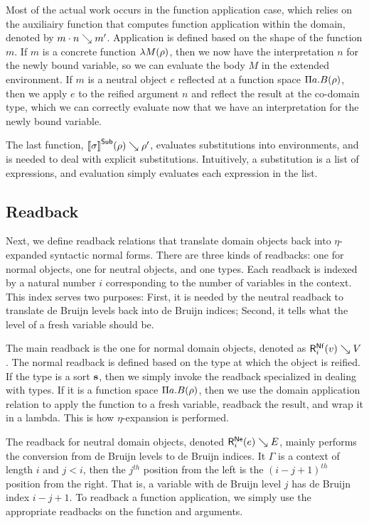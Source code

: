 Most of the actual work occurs in the function application case,
  which relies on the auxiliairy function that computes function application within the domain, denoted by $m \cdot n \searrow m'$.
Application is defined based on the shape of the function $m$.
If $m$ is a concrete function $\lambda M(\rho)$, then we now have the interpretation $n$ for the newly bound variable, so we can evaluate the body $M$ in the extended environment.
If $m$ is a neutral object $e$ reflected at a function space $\Pi a.B(\rho)$, then we apply $e$ to the reified argument $n$ and reflect the result at the co-domain type,
  which we can correctly evaluate now that we have an interpretation for the newly bound variable.
  
The last function, ${[\![\sigma]\!]}^{\mathsf{Sub}}(\rho) \searrow \rho'$, evaluates substitutions into environments, and is needed to deal with explicit substitutions.
Intuitively, a substitution is a list of expressions, and evaluation simply evaluates each expression in the list.



\subsection{Readback}



Next, we define readback relations that translate domain objects back into $\eta$-expanded syntactic normal forms.
There are three kinds of readbacks: one for normal objects, one for neutral objects, and one types.
Each readback is indexed by a natural number $i$ corresponding to the number of variables in the context.
This index serves two purposes:
First, it is needed by the neutral readback to translate de Bruijn levels back into de Bruijn indices;
Second, it tells what the level of a fresh variable should be.

The main readback is the one for normal domain objects, denoted as $\rbnf v V$.
The normal readback is defined based on the type at which the object is reified.
If the type is a sort $\textbf{s}$, then we simply invoke the readback specialized in dealing with types.
If it is a function space $\Pi a.B(\rho)$, then we use the domain application relation to apply the function to a fresh variable, readback the result, and wrap it in a lambda.
This is how $\eta$-expansion is performed.

The readback for neutral domain objects, denoted $\rbne e E$, mainly performs the conversion from de Bruijn levels to de Bruijn indices.
It $\Gamma$ is a context of length $i$ and $j < i$, then the $j^{th}$ position from the left is the $(i - j + 1)^{th}$ position from the right.
That is, a variable with de Bruijn level $j$ has de Bruijn index $i - j + 1$.
To readback a function application, we simply use the appropriate readbacks on the function and arguments.

